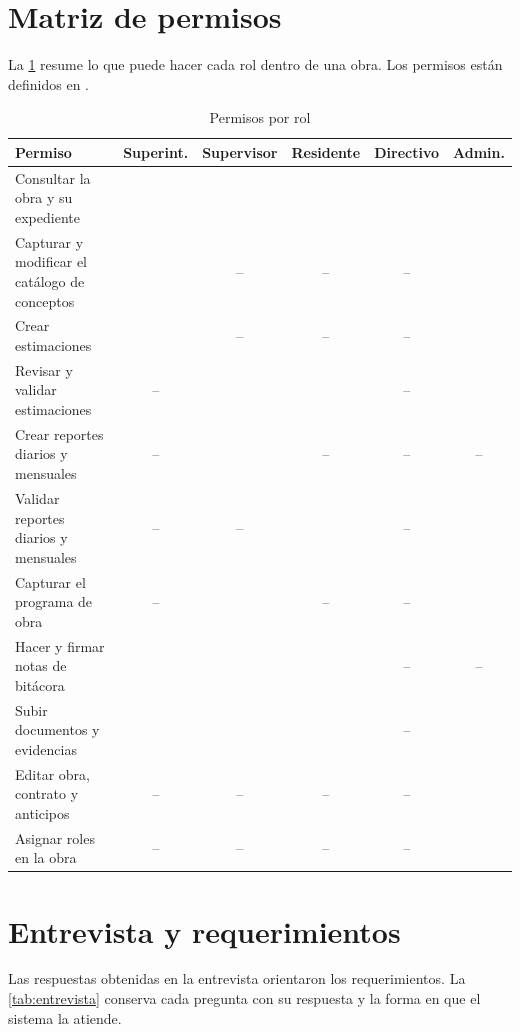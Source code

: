 \section{Matriz de permisos}
La \cref{tab:permisos} resume lo que puede hacer cada rol dentro de una obra. Los permisos están definidos en .

\begin{table}[h]
\centering\small\sffamily
\caption{Permisos por rol}\label{tab:permisos}
\newcommand{\sip}{\textcolor{verdeok}{\textbf{\checkmark}}}
\newcommand{\nop}{\textcolor{gristabla}{--}}
\renewcommand{\arraystretch}{1.18}
\begin{tabular}{@{}l*{5}{c}@{}}
\toprule
\textbf{Permiso} & \textbf{Superint.} & \textbf{Supervisor} & \textbf{Residente} & \textbf{Directivo} & \textbf{Admin.}\\\midrule
Consultar la obra y su expediente & \sip & \sip & \sip & \sip & \sip\\
Capturar y modificar el catálogo de conceptos & \sip & \nop & \nop & \nop & \sip\\
Crear estimaciones & \sip & \nop & \nop & \nop & \sip\\
Revisar y validar estimaciones & \nop & \sip & \sip & \nop & \sip\\
Crear reportes diarios y mensuales & \nop & \sip & \nop & \nop & \nop\\
Validar reportes diarios y mensuales & \nop & \nop & \sip & \nop & \sip\\
Capturar el programa de obra & \nop & \sip & \nop & \nop & \sip\\
Hacer y firmar notas de bitácora & \sip & \sip & \sip & \nop & \nop\\
Subir documentos y evidencias & \sip & \sip & \sip & \nop & \sip\\
Editar obra, contrato y anticipos & \nop & \nop & \nop & \nop & \sip\\
Asignar roles en la obra & \nop & \nop & \nop & \nop & \sip\\
\bottomrule
\end{tabular}
\end{table}

\section{Entrevista y requerimientos}
Las respuestas obtenidas en la entrevista orientaron los requerimientos. La \cref{tab:entrevista} conserva cada pregunta con su respuesta y la forma en que el sistema la atiende.

